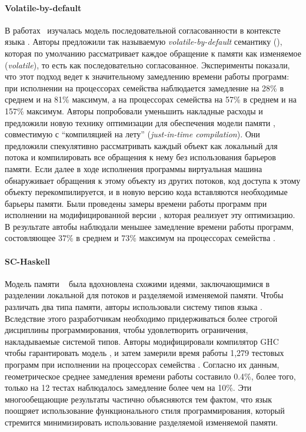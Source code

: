 \paragraph{Volatile-by-default}

В работах~\cite{Liu-al:OOPSLA17, Liu-al:PLDI19} изучалась 
модель последовательной согласованности в контексте языка \Java.
Авторы предложили так называемую \emph{volatile-by-default} семантику (\VbD),
которая по умолчанию рассматривает каждое обращение к памяти 
как изменяемое (\emph{volatile}), то есть как последовательно согласованное.  
Эксперименты показали, что этот подход ведет к значительному 
замедлению времени работы программ: 
при исполнении на процессорах семейства \Intel наблюдается 
замедление на 28\% в среднем и на 81\% максимум, 
а на процессорах семейства 
на 57\% в среднем и на 157\% максимум. 
Авторы попробовали уменьшить накладные расходы и 
предложили новую технику оптимизации для обеспечения модели памяти \SC, 
совместимую с ``компиляцией на лету'' (\emph{just-in-time compilation}).
Они предложили спекулятивно рассматривать каждый объект 
как локальный для потока и компилировать все обращения 
к нему без использования барьеров памяти. 
Если далее в ходе исполнения программы виртуальная машина
обнаруживает обращения к этому объекту из других потоков, 
код доступа к этому объекту перекомпилируется, 
и в новую версию кода вставляются необходимые барьеры памяти. 
Были проведены замеры времени работы программ
при исполнении на модифицированной версии \JVM,
которая реализует эту оптимизацию. 
В результате автобы наблюдали меньшее замедление времени работы программ, 
состовляющее 37\% в среднем и 73\% максимум на 
процессорах семейства .

\paragraph{SC-Haskell}

Модель памяти \SCHs~\cite{Vollmer-al:PPoPP17}
была вдохновлена схожими идеями, 
заключающимися в разделении локальной для потоков 
и разделяемой изменяемой памяти. 
Чтобы различать два типа памяти, 
авторы использовали систему типов языка \Haskell.
Вследствие этого разработчикам необходимо 
придерживаться более строгой дисциплины программирования, 
чтобы удовлетворить ограничения, накладываемые системой типов. 
Авторы модифицировали компилятор GHC чтобы 
гарантировать модель \SC, и затем 
замерили время работы 1,279 тестовых программ 
при исполнении на процессорах семейства \Intel. 
Согласно их данным, геометрическое среднее 
замедления времени работы составило 0.4\%, 
более того, только на 12 тестах 
наблюдалось замедление более чем на 10\%.
Эти многообещающие результаты частично объясняются тем 
фактом, что язык \Haskell поощряет 
использование функционального стиля программирования, 
который стремится минимизировать использование 
разделяемой изменяемой памяти. 

